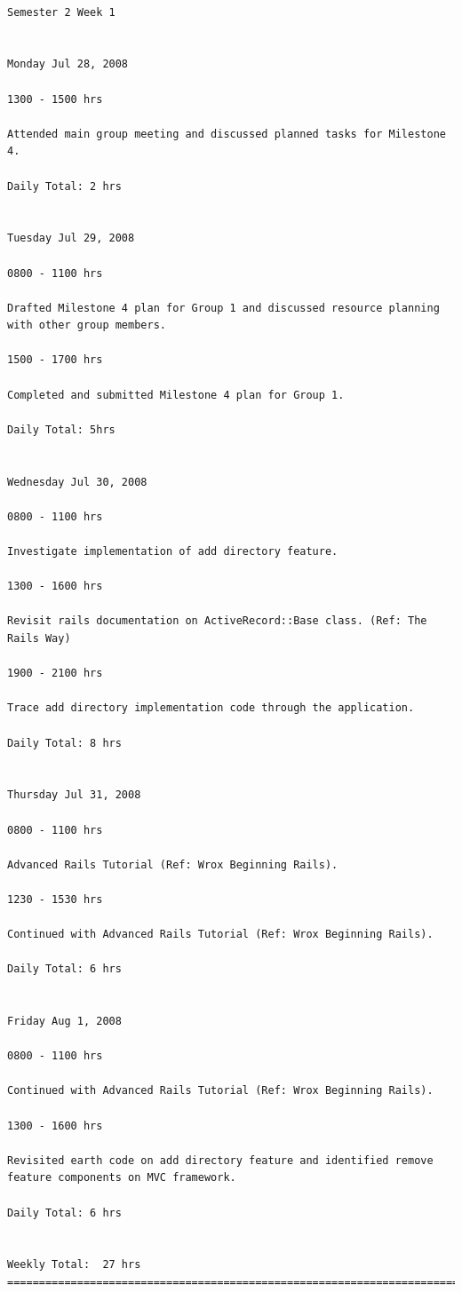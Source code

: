 \documentclass[10pt,a4,oneside]{article}
\newenvironment{mylisting}
{\begin{list}{}{\setlength{\leftmargin}{1em}}\item\scriptsize\bfseries}
{\end{list}}
\begin{document}
\begin{mylisting}
\begin{verbatim}

Semester 2 Week 1


Monday Jul 28, 2008

1300 - 1500 hrs

Attended main group meeting and discussed planned tasks for Milestone 4.

Daily Total: 2 hrs


Tuesday Jul 29, 2008

0800 - 1100 hrs

Drafted Milestone 4 plan for Group 1 and discussed resource planning with other group members.

1500 - 1700 hrs

Completed and submitted Milestone 4 plan for Group 1.

Daily Total: 5hrs


Wednesday Jul 30, 2008

0800 - 1100 hrs

Investigate implementation of add directory feature.

1300 - 1600 hrs

Revisit rails documentation on ActiveRecord::Base class. (Ref: The Rails Way)

1900 - 2100 hrs

Trace add directory implementation code through the application.

Daily Total: 8 hrs


Thursday Jul 31, 2008

0800 - 1100 hrs

Advanced Rails Tutorial (Ref: Wrox Beginning Rails).

1230 - 1530 hrs

Continued with Advanced Rails Tutorial (Ref: Wrox Beginning Rails).

Daily Total: 6 hrs


Friday Aug 1, 2008

0800 - 1100 hrs

Continued with Advanced Rails Tutorial (Ref: Wrox Beginning Rails).

1300 - 1600 hrs

Revisited earth code on add directory feature and identified remove feature components on MVC framework.

Daily Total: 6 hrs


Weekly Total:  27 hrs
========================================================================





\end{verbatim}
\end{mylisting}
\end{document}

